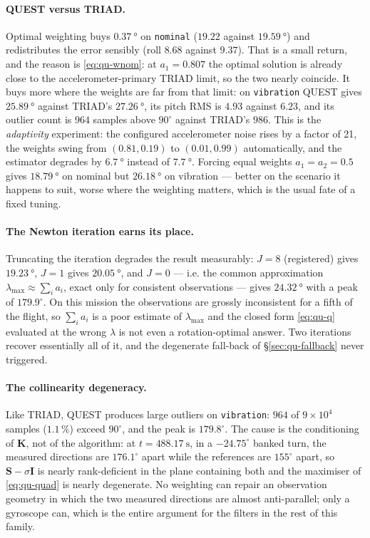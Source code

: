 \paragraph{QUEST versus TRIAD.} Optimal weighting buys $\SI{0.37}{\degree}$ on \texttt{nominal}
($19.22$ against $\SI{19.59}{\degree}$) and redistributes the error sensibly (roll $8.68$ against
$9.37$). That is a small return, and the reason is \eqref{eq:qu-wnom}: at $a_1=0.807$ the optimal
solution is already close to the accelerometer-primary TRIAD limit, so the two nearly coincide. It
buys more where the weights are far from that limit: on \texttt{vibration} QUEST gives
$\SI{25.89}{\degree}$ against TRIAD's $\SI{27.26}{\degree}$, its pitch RMS is $4.93$ against $6.23$,
and its outlier count is $964$ samples above $90^\circ$ against TRIAD's $986$. This is the
\emph{adaptivity} experiment: the configured accelerometer noise rises by a factor of 21, the
weights swing from $(0.81,0.19)$ to $(0.01,0.99)$ automatically, and the estimator degrades by
$\SI{6.7}{\degree}$ instead of $\SI{7.7}{\degree}$. Forcing equal weights $a_1=a_2=0.5$ gives
$\SI{18.79}{\degree}$ on nominal but $\SI{26.18}{\degree}$ on vibration --- better on the scenario it
happens to suit, worse where the weighting matters, which is the usual fate of a fixed tuning.

\paragraph{The Newton iteration earns its place.} Truncating the iteration degrades the result
measurably: $J=8$ (registered) gives $\SI{19.23}{\degree}$, $J=1$ gives $\SI{20.05}{\degree}$, and
$J=0$ --- i.e. the common approximation $\lambda_{\max}\approx\sum_i a_i$, exact only for consistent
observations --- gives $\SI{24.32}{\degree}$ with a peak of $179.9^\circ$. On this mission the
observations are grossly inconsistent for a fifth of the flight, so $\sum_i a_i$ is a poor estimate
of $\lambda_{\max}$ and the closed form \eqref{eq:qu-q} evaluated at the wrong $\lambda$ is not even
a rotation-optimal answer. Two iterations recover essentially all of it, and the degenerate
fall-back of \S\ref{sec:qu-fallback} never triggered.

\paragraph{The collinearity degeneracy.} Like TRIAD, QUEST produces large outliers on
\texttt{vibration}: $964$ of $9\times10^4$ samples ($1.1\,\%$) exceed $90^\circ$, and the peak is
$179.8^\circ$. The cause is the conditioning of $\bm{K}$, not of the algorithm: at
$t=\SI{488.17}{\second}$, in a $-24.75^\circ$ banked turn, the measured directions are $176.1^\circ$
apart while the references are $155^\circ$ apart, so $\bm{S}-\sigma\bm{I}$ is nearly rank-deficient
in the plane containing both and the maximiser of \eqref{eq:qu-quad} is nearly degenerate. No
weighting can repair an observation geometry in which the two measured directions are almost
anti-parallel; only a gyroscope can, which is the entire argument for the filters in the rest of
this family.

